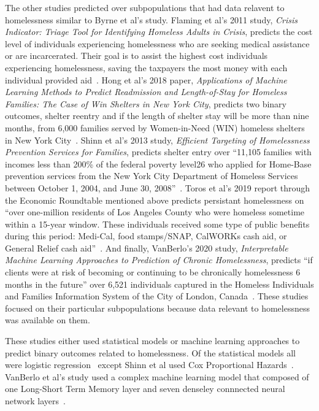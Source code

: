 \documentclass[10pt,letterpaper]{article}
\begin{document}
The other studies predicted over subpopulations that had data relavent to homelessness similar to Byrne et al's study. Flaming et al's 2011 study, \textit{Crisis Indicator: Triage Tool for Identifying Homeless Adults in Crisis}, predicts the cost level of individuals experiencing homelessness who are seeking medical assistance or are incarcerated. Their goal is to assist the highest cost individuals experiencing homelessness, saving the taxpayers the most money with each individual provided aid~\cite{flaming2011crisis}. Hong et al's 2018 paper, \textit{Applications of Machine Learning Methods to Predict Readmission and Length-of-Stay for Homeless Families: The Case of Win Shelters in New York City}, predicts two binary outcomes, shelter reentry and if the length of shelter stay will be more than nine months, from 6,000 families served by Women-in-Need (WIN) homeless shelters in New York City~\cite{hong2018applications}. Shinn et al's 2013 study, \textit{Efficient Targeting of Homelessness Prevention Services for Families}, predicts shelter entry over ``11,105 families with incomes less than 200\% of the federal poverty level26 who applied for Home-Base prevention services from the New York City Department of Homeless Services between October 1, 2004, and June 30, 2008''~\cite{shinn2013efficient}. Toros et al's 2019 report through the Economic Roundtable mentioned above predicts persistant homelessness on ``over one-million residents of Los Angeles County who were homeless sometime within a 15-year window. These  individuals received some type of public benefits during this period: Medi-Cal, food  stamps/SNAP, CalWORKs cash aid, or General Relief cash aid''~\cite{toros2019early}. And finally, VanBerlo's 2020 study, \textit{Interpretable Machine Learning Approaches to Prediction of Chronic Homelessness}, predicts ``if clients were at risk of becoming or continuing to be chronically homelessness 6 months in the future'' over 6,521 individuals captured in the Homeless Individuals and Families Information System of the City of London, Canada~\cite{vanberlo2021interpretable}. These studies focused on their particular subpopulations because data relevant to homelessness was available on them.

These studies either used statistical models or machine learning approaches to predict binary outcomes related to homelessness. Of the statistical models all were logistic regression~\cite{byrne2020classification,flaming2011crisis,hong2018appplicaitons,toros2019early} except Shinn et al used Cox Proportional Hazards~\cite{shinn2013efficient}. VanBerlo et al's study used a complex machine learning model that composed of one Long-Short Term Memory layer and seven denseley connnected neural network layers~\cite{vanberlo2021interpretable}. 
\end{document}
